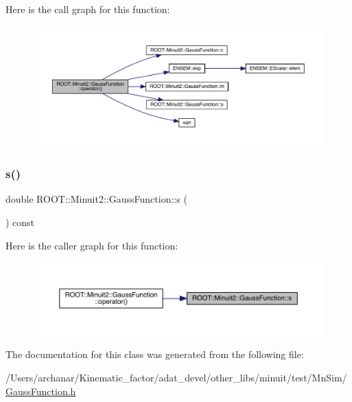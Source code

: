 Here is the call graph for this function\+:\nopagebreak
\begin{figure}[H]
\begin{center}
\leavevmode
\includegraphics[width=350pt]{d7/d62/classROOT_1_1Minuit2_1_1GaussFunction_a5fe07f3350b17d79583af7b844ded399_cgraph}
\end{center}
\end{figure}
\mbox{\label{classROOT_1_1Minuit2_1_1GaussFunction_aae78103bd6daf029fdb95d70185803e2}} 
\subsubsection{\texorpdfstring{s()}{s()}}
{\footnotesize\ttfamily double R\+O\+O\+T\+::\+Minuit2\+::\+Gauss\+Function\+::s (\begin{DoxyParamCaption}{ }\end{DoxyParamCaption}) const\hspace{0.3cm}{\ttfamily [inline]}}

Here is the caller graph for this function\+:\nopagebreak
\begin{figure}[H]
\begin{center}
\leavevmode
\includegraphics[width=350pt]{d7/d62/classROOT_1_1Minuit2_1_1GaussFunction_aae78103bd6daf029fdb95d70185803e2_icgraph}
\end{center}
\end{figure}


The documentation for this class was generated from the following file\+:\begin{DoxyCompactItemize}
\item 
/\+Users/archanar/\+Kinematic\+\_\+factor/adat\+\_\+devel/other\+\_\+libs/minuit/test/\+Mn\+Sim/\mbox{\hyperlink{GaussFunction_8h}{Gauss\+Function.\+h}}\end{DoxyCompactItemize}
